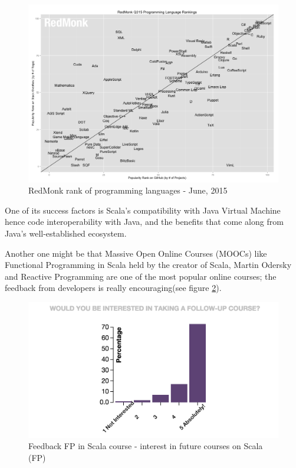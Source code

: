 \documentclass{article}
\begin{document}
\begin{figure}[h!]
  \includegraphics[width=\linewidth]{redmonk-rank.png}
  \caption{RedMonk rank of programming languages - June, 2015}
  \label{fig:redmonk-rank}
\end{figure}

One of its success factors is  Scala's compatibility with Java Virtual Machine hence code interoperability with Java, and the benefits that come along from  Java's well-established ecosystem.\par

 Another one might be that Massive Open Online Courses (MOOCs)  like Functional Programming in Scala \cite{scalastat:1} held  by the creator of Scala, Martin Odersky and Reactive Programming are one of the most popular online courses; the feedback from developers is really encouraging(see figure \ref{fig:interest}). \par

\begin{figure}[h!]
  \includegraphics[width=\linewidth]{interest.png}
  \caption{Feedback FP in Scala course - interest in future courses on Scala (FP)}
  \label{fig:interest}
\end{figure}
\end{document}

